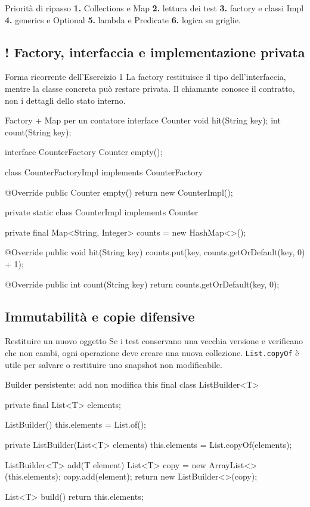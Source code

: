 ﻿\documentclass[10pt,a4paper]{article}
\newcommand{\cmd}[1]{\texttt{#1}}
\DeclareRobustCommand{\exammark}{%
  \texorpdfstring{\textcolor{examred}{\bfseries\Large !}\hspace{.18em}}{! }%
}
\newcommand{\topicsubsection}[1]{\Needspace{10\baselineskip}\subsection{#1}}
\newenvironment{topicblock}{%
  \par\medskip\noindent\begin{minipage}{\textwidth}%
}{%
  \end{minipage}\par\medskip%
}
\begin{document}
\begin{difference}{Priorità di ripasso}
\textbf{1.} Collections e Map \quad
\textbf{2.} lettura dei test \quad
\textbf{3.} factory e classi Impl \quad
\textbf{4.} generics e Optional \quad
\textbf{5.} lambda e Predicate \quad
\textbf{6.} logica su griglie.
\end{difference}

\begin{topicblock}
\topicsubsection{\exammark Factory, interfaccia e implementazione privata}
\begin{concept}{Forma ricorrente dell'Esercizio 1}
La factory restituisce il tipo dell'interfaccia, mentre la classe concreta
può restare privata. Il chiamante conosce il contratto, non i dettagli dello
stato interno.
\end{concept}

\begin{codebox}{Factory + Map per un contatore}
interface Counter {
    void hit(String key);
    int count(String key);
}

interface CounterFactory {
    Counter empty();
}

class CounterFactoryImpl implements CounterFactory {
    @Override
    public Counter empty() {
        return new CounterImpl();
    }

    private static class CounterImpl implements Counter {
        private final Map<String, Integer> counts = new HashMap<>();

        @Override
        public void hit(String key) {
            counts.put(key, counts.getOrDefault(key, 0) + 1);
        }

        @Override
        public int count(String key) {
            return counts.getOrDefault(key, 0);
        }
    }
}
\end{codebox}
\end{topicblock}

\begin{topicblock}
\topicsubsection{Immutabilità e copie difensive}
\begin{concept}{Restituire un nuovo oggetto}
Se i test conservano una vecchia versione e verificano che non cambi, ogni
operazione deve creare una nuova collezione. \cmd{List.copyOf} è utile per
salvare o restituire uno snapshot non modificabile.
\end{concept}

\begin{codebox}{Builder persistente: add non modifica this}
final class ListBuilder<T> {
    private final List<T> elements;

    ListBuilder() {
        this.elements = List.of();
    }

    private ListBuilder(List<T> elements) {
        this.elements = List.copyOf(elements);
    }

    ListBuilder<T> add(T element) {
        List<T> copy = new ArrayList<>(this.elements);
        copy.add(element);
        return new ListBuilder<>(copy);
    }

    List<T> build() {
        return this.elements;
    }
}
\end{codebox}
\end{topicblock}
\end{document}
